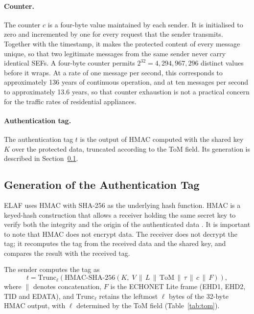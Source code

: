 \paragraph{Counter.} The counter $c$ is a four-byte value maintained by each sender. It is initialised to zero and incremented by one for every request that the sender transmits. Together with the timestamp, it makes the protected content of every message unique, so that two legitimate messages from the same sender never carry identical SEFs. A four-byte counter permits $2^{32} = 4{,}294{,}967{,}296$ distinct values before it wraps. At a rate of one message per second, this corresponds to approximately 136 years of continuous operation, and at ten messages per second to approximately 13.6 years, so that counter exhaustion is not a practical concern for the traffic rates of residential appliances.

\paragraph{Authentication tag.} The authentication tag $t$ is the output of HMAC computed with the shared key $K$ over the protected data, truncated according to the ToM field. Its generation is described in Section~\ref{sec:m-tag}.

\subsection{Generation of the Authentication Tag}
\label{sec:m-tag}

ELAF uses HMAC with SHA-256 as the underlying hash function. HMAC is a keyed-hash construction that allows a receiver holding the same secret key to verify both the integrity and the origin of the authenticated data \citep{RFC2104}. It is important to note that HMAC does not encrypt data. The receiver does not decrypt the tag; it recomputes the tag from the received data and the shared key, and compares the result with the received tag.

The sender computes the tag as
\begin{equation}
  t = \mathrm{Trunc}_{\ell}\!\left( \mathrm{HMAC\text{-}SHA\text{-}256}\left(K,\; V \,\|\, L \,\|\, \mathrm{ToM} \,\|\, \tau \,\|\, c \,\|\, F \right) \right),
  \label{eq:tag}
\end{equation}
where $\|$ denotes concatenation, $F$ is the ECHONET Lite frame (EHD1, EHD2, TID and EDATA), and $\mathrm{Trunc}_{\ell}$ retains the leftmost $\ell$ bytes of the 32-byte HMAC output, with $\ell$ determined by the ToM field (Table~\ref{tab:tom}).

